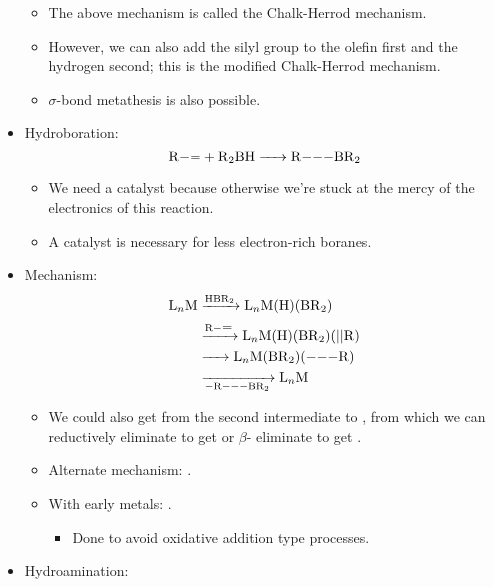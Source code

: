 \documentclass[../notes.tex]{subfiles}
\begin{document}
\begin{itemize}
\begin{itemize}
        \item The above mechanism is called the Chalk-Herrod mechanism.
        \item However, we can also add the silyl group to the olefin first and the hydrogen second; this is the modified Chalk-Herrod mechanism.
        \item $\sigma$-bond metathesis is also possible.
    \end{itemize}
    \item Hydroboration:
    \begin{equation*}
        \ce{R-= + R2BH -> R---BR2}
    \end{equation*}
    \begin{itemize}
        \item We need a catalyst because otherwise we're stuck at the mercy of the electronics of this reaction.
        \item A catalyst is necessary for less electron-rich boranes.
    \end{itemize}
    \item Mechanism:
    \begin{align*}
        \ce{L_nM} &\ce{->[HBR2]} \ce{L_nM(H)(BR2)}\\
        &\ce{->[R-=]} \ce{L_nM(H)(BR2)(||R)}\\
        &\ce{->} \ce{L_nM(BR2)(---R)}\\
        &\ce{->[][-R---BR2]} \ce{L_nM}
    \end{align*}
    \begin{itemize}
        \item We could also get from the second intermediate to , from which we can reductively eliminate to get  or $\beta$- eliminate to get .
        \item Alternate mechanism:  .
        \item With early metals: .
        \begin{itemize}
            \item Done to avoid oxidative addition type processes.
        \end{itemize}
    \end{itemize}
    \item Hydroamination:
    \begin{equation*}

\end{equation*}
\end{itemize}
\end{document}
